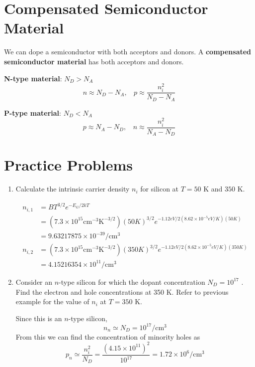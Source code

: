\section{Compensated Semiconductor Material}
We can dope a semiconductor with both acceptors and donors. A \textbf{compensated semiconductor material} has both acceptors and donors.

\textbf{N-type material}: $N_D > N_A$
\[n \approx N_D - N_A, ~~~~ p \approx \frac{n_i^2}{N_D - N_A}\]

\textbf{P-type material}: $N_D < N_A$
\[p \approx N_A - N_D, ~~~~ n \approx \frac{n_i^2}{N_A - N_D}\]

\section{Practice Problems}
    \begin{enumerate}
        \item Calculate the intrinsic carrier density $n_i$ for silicon at $T = 50$ K and $350$ K.
        \begin{Ans}
            \begin{align*}
                n_{i,1} &= BT^{3/2} e^{-E_G / 2kT} \\
                &= (7.3 \times 10^{15} \text{cm}^{-3} \text{K}^{-3/2})(50 K)^{3/2} e^{-1.12 eV / 2(8.62 \times 10^{-5} eV/K)(50 K)} \\
                &= 9.63217875 \times 10^{-39} / \text{cm}^3 \\
                n_{i,2} &= (7.3 \times 10^{15} \text{cm}^{-3} \text{K}^{-3/2})(350 K)^{3/2} e^{-1.12 eV / 2(8.62 \times 10^{-5} eV/K)(350 K)} \\
                &= 4.15216354 \times 10^{11} / \text{cm}^3
            \end{align*}
        \end{Ans}

        \item Consider an $n$-type silicon for which the dopant concentration $N_D = 10^{17}$ \conc. Find the electron and hole concentrations at 350 K. Refer to previous example for the value of $n_i$ at $T = 350$ K.
        \begin{Ans}
            Since this is an $n$-type silicon, 
                \[n_n \simeq N_D = 10^{17} /\text{cm}^3\]
            From this we can find the concentration of minority holes as 
                \[p_n \simeq \frac{n_i^2}{N_D} = \frac{(4.15 \times 10^{11})^2}{10^17} = 1.72 \times 10^6 / \text{cm}^3\]
        \end{Ans}


\end{enumerate}
